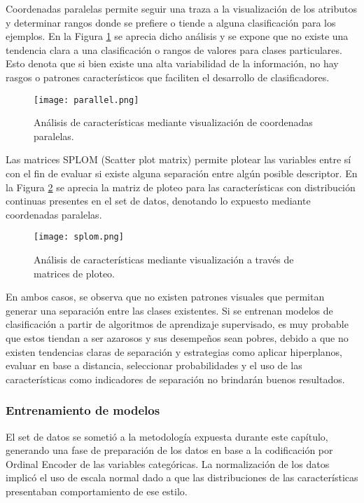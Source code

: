 Coordenadas paralelas permite seguir una traza a la visualización de los atributos y determinar rangos donde se prefiere o tiende a alguna clasificación para los ejemplos. En la Figura \ref{parallel} se aprecia dicho análisis y se expone que no existe una tendencia clara a una clasificación o rangos de valores para clases particulares. Esto denota que si bien existe una alta variabilidad de la información, no hay rasgos o patrones característicos que faciliten el desarrollo de clasificadores.

\begin{figure}[!h]
	
	\texttt{[image: parallel.png]}
	\caption{Análisis de características mediante visualización de coordenadas paralelas.}
	\label{parallel}
\end{figure}

Las matrices SPLOM (Scatter plot matrix) permite plotear las variables entre sí con el fin de evaluar si existe alguna separación entre algún posible descriptor. En la Figura \ref{scatter} se aprecia la matriz de ploteo para las características con distribución continuas presentes en el set de datos, denotando lo expuesto mediante coordenadas paralelas.

\begin{figure}[!h]
	
	\texttt{[image: splom.png]}
	\caption{Análisis de características mediante visualización a través de matrices de ploteo.}
	\label{scatter}
\end{figure}

En ambos casos, se observa que no existen patrones visuales que permitan generar una separación entre las clases existentes. Si se entrenan modelos de clasificación a partir de algoritmos de aprendizaje supervisado, es muy probable que estos tiendan a ser azarosos y sus desempeños sean pobres, debido a que no existen tendencias claras de separación y estrategias como aplicar hiperplanos, evaluar en base a distancia, seleccionar probabilidades y el uso de las características como indicadores de separación no brindarán buenos resultados.

\subsubsection{Entrenamiento de modelos}

El set de datos se sometió a la metodología expuesta durante este capítulo, generando una fase de preparación de los datos en base a la codificación por Ordinal Encoder de las variables categóricas. La normalización de los datos implicó el uso de escala normal dado a que las distribuciones de las características presentaban comportamiento de ese estilo. 

